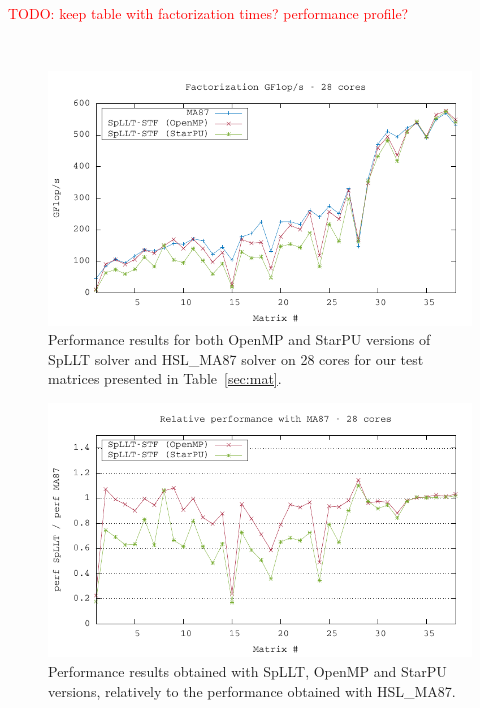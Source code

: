\documentclass{article}
\newcommand{\alert}[1]{\textcolor{red}{#1}\xspace}
\newcommand{\starpu}{{StarPU}\xspace}
\newcommand{\TODO}[1]{\alert{TODO: #1}\xspace}
\newcommand{\openmp}{OpenMP\xspace}
\newcommand{\ma}{HSL\_MA87\xspace}
\begin{document}
\TODO{keep table with factorization times? performance profile?}

\begin{table}[htbp]
    \begin{center}
      \texttt{
        }
    \end{center}
    \caption{Factorization times (seconds) obtained with MA87 and
      SpLLT (i.e. MA87\_starpu). The factorizations were run with the
      block sizes \texttt{nb=(256, 384, 512, 768, 1024)} on 28 cores
      and \texttt{nemin=32}. The lowest factorization times are shown
      in bold.}
\end{table}


\begin{figure}[!h]
  \centering
  \includegraphics[width=\textwidth]{data/cmp_perf_stf}
  \caption{\label{fig:exp-perf} Performance results for both \openmp
    and \starpu versions of SpLLT solver and \ma solver on 28 cores
    for our test matrices presented in Table~\ref{sec:mat}.}
\end{figure}

\begin{figure}[!h]
  \centering
  \includegraphics[width=\textwidth]{data/cmp_facto_rel_stf}
  \caption{\label{fig:exp-rel-perf}Performance results obtained with
    SpLLT, \openmp and \starpu versions, relatively to the performance
    obtained with \ma.}
\end{figure}
\end{document}
